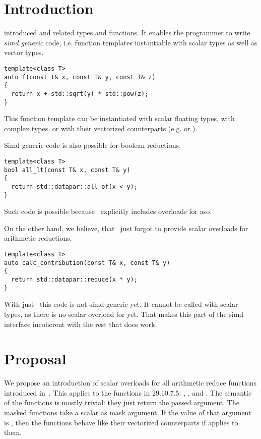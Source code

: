 \pagestyle{scrheadings}

%


\section{Introduction}
\cite{P1928R15} introduced  and related types and functions.
It enables the programmer to write \emph{simd generic} code, i.e. function templates instantiable
with scalar types as well as vector types.
\medskip\begin{lstlisting}[style=Vc]
template<class T>
auto f(const T& x, const T& y, const T& z)
{
  return x + std::sqrt(y) * std::pow(z);
}
\end{lstlisting}
This function template can be instantiated with scalar floating types, with complex types, or with their
vectorized counterparts (e.g.  or ).

Simd generic code is also possible for boolean reductions.
\medskip\begin{lstlisting}[style=Vc]
template<class T>
bool all_lt(const T& x, const T& y)
{
  return std::datapar::all_of(x < y);
}
\end{lstlisting}
Such code is possible because~\cite{P1928R15} explicitly includes overloads for  aso.

On the other hand, we believe, that~\cite{P1928R15} just forgot to provide scalar overloads for arithmetic reductions.
\medskip\begin{lstlisting}[style=Vc]
template<class T>
auto calc_contribution(const T& x, const T& y)
{
  return std::datapar::reduce(x * y);
}
\end{lstlisting}
With just~\cite{P1928R15} this code is not simd generic yet.
It cannot be called with scalar types, as there is no scalar overload for  yet.
That makes this part of the simd interface incoherent with the rest that does work.

\section{Proposal}

We propose an introduction of scalar overloads for all arithmetic reduce functions introduced in~\cite{P1928R15}.
This applies to the functions in 29.10.7.5: , , and .
The semantic of the functions is mostly trivial: they just return the passed argument.
The masked functions take a scalar  as mask argument.
If the value of that argument is , then the functions behave like their vectorized counterparts
if  applies to them.

